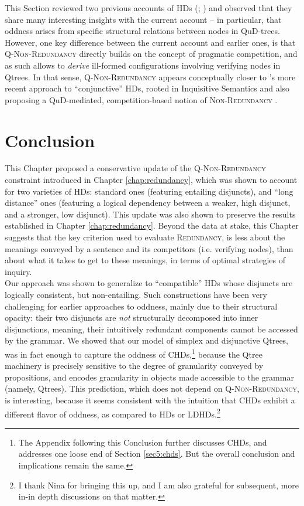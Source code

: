 This Section reviewed two previous accounts of HDs (; ) and observed that they share many interesting insights with the current account -- in particular, that oddness arises from specific structural relations between nodes in QuD-trees. However, one key difference between the current account and earlier ones, is that \textsc{Q-Non-Redundancy} directly builds on the concept of pragmatic competition, and as such allows to \textit{derive} ill-formed configurations involving verifying nodes in Qtrees. In that sense, \textsc{Q-Non-Redundancy} appears conceptually closer to \citeauthor{Zhang2024}'s more recent approach to ``conjunctive'' HDs, rooted in Inquisitive Semantics and also proposing a QuD-mediated, competition-based notion of \textsc{Non-Redundancy} .


\section{Conclusion}\label{sec5:ccl}

This Chapter proposed a conservative update of the \textsc{Q-Non-Redundancy} constraint introduced in Chapter \ref{chap:redundancy}, which was shown to account for two varieties of HDs: standard ones (featuring entailing disjuncts), and ``long distance'' ones (featuring a logical dependency between a weaker, high disjunct, and a stronger, low disjunct).
This update was also shown to preserve the results established in Chapter \ref{chap:redundancy}. Beyond the data at stake, this Chapter suggests that the key criterion used to evaluate \textsc{Redundancy}, is less about the meanings conveyed by a sentence and its competitors (i.e. verifying nodes), than about what it takes to get to these meanings, in terms of optimal strategies of inquiry.\\

Our approach was shown to generalize to ``compatible'' HDs whose disjuncts are logically consistent, but non-entailing.  Such constructions have been very challenging for earlier approaches to oddness, mainly due to their structural opacity: their two disjuncts are \textit{not} structurally decomposed into inner disjunctions, meaning, their intuitively redundant components cannot be accessed by the grammar. We showed that our model of simplex and disjunctive Qtrees, was in fact enough to capture the oddness of CHDs,\footnote{The Appendix following this Conclusion further discusses CHDs, and addresses one loose end of Section \ref{sec5:chds}. But the overall conclusion and implications remain the same.} because the Qtree machinery is precisely sensitive to the degree of granularity conveyed by propositions, and encodes granularity in objects made accessible to the grammar (namely, Qtrees). This prediction, which does not depend on \textsc{Q-Non-Redundancy}, is interesting, because it seems consistent with the intuition that CHDs exhibit a different flavor of oddness, as compared to HDs or LDHDs.\footnote{I thank Nina for bringing this up, and I am also grateful for subsequent, more in-in depth discussions on that matter.}  

